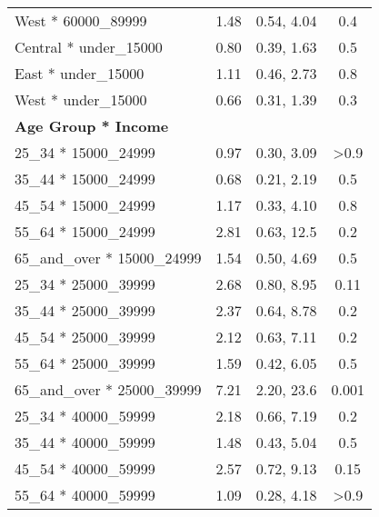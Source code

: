 \documentclass[
  letterpaper,
  DIV=11,
  numbers=noendperiod]{scrartcl}
\begin{document}
\begin{longtable}{lccc}
\hspace{1em}West * 60000\_89999 & 1.48 & 0.54, 4.04 & 0.4\\
\hspace{1em}Central * under\_15000 & 0.80 & 0.39, 1.63 & 0.5\\
\hspace{1em}East * under\_15000 & 1.11 & 0.46, 2.73 & 0.8\\
\hspace{1em}West * under\_15000 & 0.66 & 0.31, 1.39 & 0.3\\
\addlinespace
\textbf{Age Group * Income} &  &  & \\
\hspace{1em}25\_34 * 15000\_24999 & 0.97 & 0.30, 3.09 & >0.9\\
\hspace{1em}35\_44 * 15000\_24999 & 0.68 & 0.21, 2.19 & 0.5\\
\hspace{1em}45\_54 * 15000\_24999 & 1.17 & 0.33, 4.10 & 0.8\\
\hspace{1em}55\_64 * 15000\_24999 & 2.81 & 0.63, 12.5 & 0.2\\
\addlinespace
\hspace{1em}65\_and\_over * 15000\_24999 & 1.54 & 0.50, 4.69 & 0.5\\
\hspace{1em}25\_34 * 25000\_39999 & 2.68 & 0.80, 8.95 & 0.11\\
\hspace{1em}35\_44 * 25000\_39999 & 2.37 & 0.64, 8.78 & 0.2\\
\hspace{1em}45\_54 * 25000\_39999 & 2.12 & 0.63, 7.11 & 0.2\\
\hspace{1em}55\_64 * 25000\_39999 & 1.59 & 0.42, 6.05 & 0.5\\
\addlinespace
\hspace{1em}65\_and\_over * 25000\_39999 & 7.21 & 2.20, 23.6 & 0.001\\
\hspace{1em}25\_34 * 40000\_59999 & 2.18 & 0.66, 7.19 & 0.2\\
\hspace{1em}35\_44 * 40000\_59999 & 1.48 & 0.43, 5.04 & 0.5\\
\hspace{1em}45\_54 * 40000\_59999 & 2.57 & 0.72, 9.13 & 0.15\\
\hspace{1em}55\_64 * 40000\_59999 & 1.09 & 0.28, 4.18 & >0.9\\

\end{longtable}
\end{document}
